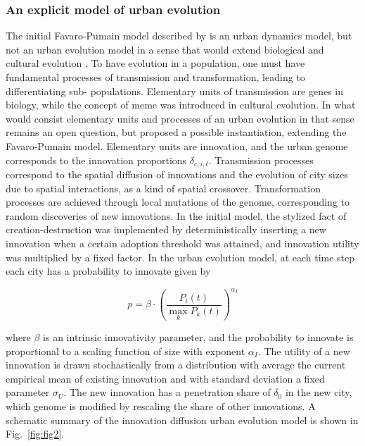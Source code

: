 \documentclass[10pt,letterpaper]{article}
\begin{document}
\subsubsection{An explicit model of urban evolution}

The initial Favaro-Pumain model described by \citep{favaro2011gibrat} is an urban dynamics model, but not an urban evolution model in a sense that would extend biological and cultural evolution \citep{mesoudi2017pursuing}. To have evolution in a population, one must have fundamental processes of transmission and transformation, leading to differentiating sub- populations. Elementary units of transmission are genes in biology, while the concept of meme was introduced in cultural evolution. In what would consist elementary units and processes of an urban evolution in that sense remains an open question, but \citep{raimbault2020model} proposed a possible instantiation, extending the Favaro-Pumain model. Elementary units are innovation, and the urban genome corresponds to the innovation proportions $\delta_{c,i,t}$. Transmission processes correspond to the spatial diffusion of innovations and the evolution of city sizes due to spatial interactions, as a kind of spatial crossover. Transformation processes are achieved through local mutations of the genome, corresponding to random discoveries of new innovations. In the initial model, the stylized fact of creation-destruction was implemented by deterministically inserting a new innovation when a certain adoption threshold was attained, and innovation utility was multiplied by a fixed factor. In the urban evolution model, at each time step each city has a probability to innovate given by

\begin{equation}
	p = \beta \cdot \left( \frac{P_i(t)}{\max_k P_k(t)} \right)^{\alpha_I}	
\end{equation}

where $\beta$ is an intrinsic innovativity parameter, and the probability to innovate is proportional to a scaling function of size with exponent $\alpha_I$. The utility of a new innovation is drawn stochastically from a distribution with average the current empirical mean of existing innovation and with standard deviation a fixed parameter $\sigma_U$. The new innovation has a penetration share of $\delta_0$ in the new city, which genome is modified by rescaling the share of other innovations. A schematic summary of the innovation diffusion urban evolution model is shown in Fig.~\ref{fig:fig2}.
\end{document}
